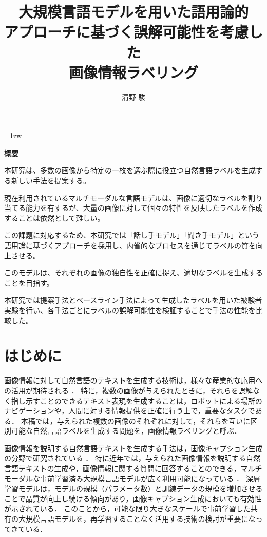 \documentclass[a4paper,11pt]{jreport}
\title{大規模言語モデルを用いた語用論的\\アプローチに基づく誤解可能性を考慮した\\画像情報ラベリング}
\author{清野 駿}
\begin{document}
\maketitle
\thispagestyle{empty}
\newpage

\thispagestyle{empty}
\vspace*{20pt plus 1fil}
\parindent=1zw
\noindent
\begin{center}
{\bf 概要}
\vspace{5mm}
\end{center}
本研究は、多数の画像から特定の一枚を選ぶ際に役立つ自然言語ラベルを生成する新しい手法を提案する。

現在利用されているマルチモーダルな言語モデルは、画像に適切なラベルを割り当てる能力を有するが、大量の画像に対して個々の特性を反映したラベルを作成することは依然として難しい。

この課題に対応するため、本研究では「話し手モデル」「聞き手モデル」という語用論に基づくアプローチを採用し、内省的なプロセスを通じてラベルの質を向上させる。

このモデルは、それぞれの画像の独自性を正確に捉え、適切なラベルを生成することを目指す。

本研究では提案手法とベースライン手法によって生成したラベルを用いた被験者実験を行い、各手法ごとにラベルの誤解可能性を検証することで手法の性能を比較した。

\par
\vspace{0pt plus 1fil}
\newpage

\tableofcontents
\listoffigures

\pagebreak \setcounter{page}{1}


\chapter{はじめに}

画像情報に対して自然言語のテキストを生成する技術は，様々な産業的な応用への活用が期待される \cite{Yin2023}．
特に，複数の画像が与えられたときに，それらを誤解なく指し示すことのできるテキスト表現を生成することは，ロボットによる場所のナビゲーションや，人間に対する情報提供を正確に行う上で，重要なタスクである．
本稿では，与えられた複数の画像のそれぞれに対して，それらを互いに区別可能な自然言語ラベルを生成する問題を，画像情報ラベリングと呼ぶ．

画像情報を説明する自然言語テキストを生成する手法は，画像キャプション生成の分野で研究されている \cite{Farhadi2010,Vinyals2017,Dai2023}．
特に近年では，与えられた画像情報を説明する自然言語テキストの生成や，画像情報に関する質問に回答することのできる，マルチモーダルな事前学習済み大規模言語モデルが広く利用可能になっている \cite{Gan2022}．
深層学習モデルは，モデルの規模（パラメータ数）と訓練データの規模を増加させることで品質が向上し続ける傾向があり\cite{Devlin2019}，画像キャプション生成においても有効性が示されている．
このことから，可能な限り大きなスケールで事前学習した共有の大規模言語モデルを，再学習することなく活用する技術の検討が重要になってきている．
\end{document}
